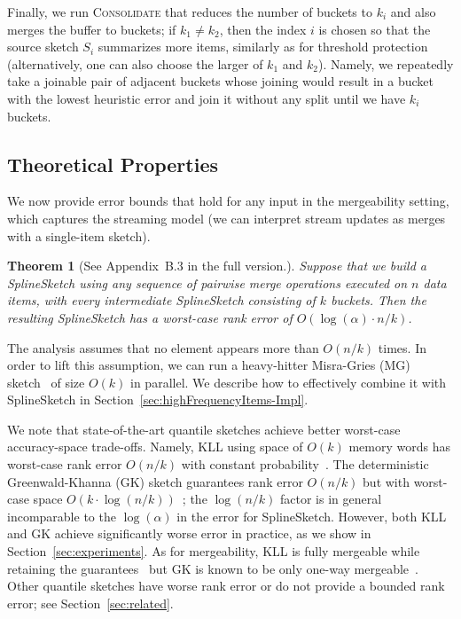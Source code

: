 \documentclass[acmsmall]{acmart}
\newcommand{\consolidate}{\textsc{Consolidate}\xspace}
\newtheorem{theorem}{Theorem}
\theoremstyle{remark}
\begin{document}
Finally, we run \consolidate that reduces the number of buckets to $k_i$ and also merges the buffer to buckets; if $k_1\neq k_2$, then the index $i$ is chosen so that the source sketch $S_i$ summarizes more items, similarly as for threshold protection (alternatively, one can also choose the larger of $k_1$ and $k_2$). Namely, we repeatedly take a joinable pair of adjacent buckets whose joining would result in a bucket with the lowest heuristic error and join it without any split until we have $k_i$ buckets.






\subsection{Theoretical Properties}\label{sec:theory}

	We now provide error bounds that hold for any input in the mergeability setting,
	which captures the streaming model (we can interpret stream updates as merges with a single-item sketch).
		\begin{theorem}[See Appendix~B.3 in the full version.]\label{thm:main}
			Suppose that we build a SplineSketch using any sequence of pairwise merge operations executed on $n$ data items, with every intermediate SplineSketch consisting of $k$ buckets.
			Then the resulting SplineSketch has a worst-case rank error of $O(\log (\alpha) \cdot n / k)$.
		\end{theorem}

The analysis assumes that no element appears more than $O(n/k)$ times.
In order to lift this assumption, we can run a heavy-hitter Misra-Gries (MG) sketch~\cite{misra1982finding} of size $O(k)$ in parallel.
We describe how to effectively combine it with SplineSketch in Section~\ref{sec:highFrequencyItems-Impl}.

We note that state-of-the-art quantile sketches achieve better worst-case accuracy-space trade-offs.
Namely, KLL using space of $O(k)$ memory words has worst-case rank error $O(n/k)$ with constant probability~\cite{KarninLL16}.
The deterministic Greenwald-Khanna (GK) sketch guarantees rank error $O(n/k)$ but with worst-case space $O(k\cdot \log (n/k))$~\cite{greenwald2001space}; the $ \log (n/k)$ factor is in general incomparable to the $\log (\alpha)$ in the error for SplineSketch.
However, both KLL and GK achieve significantly worse error in practice, as we show in Section~\ref{sec:experiments}.
As for mergeability, KLL is fully mergeable while retaining the guarantees~\cite{KarninLL16} but GK is known to be only one-way mergeable~\cite{AgarwalCHPWY13}.
Other quantile sketches have worse rank error or do not provide a bounded rank error; see Section~\ref{sec:related}.
\end{document}
